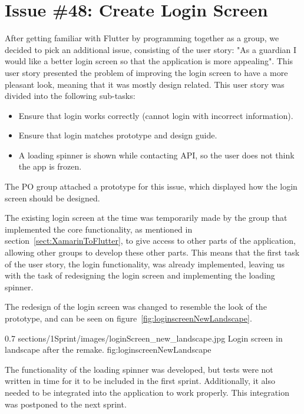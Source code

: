 \section{Issue \#48: Create Login Screen}
\label{sect:loginScreenFlutter}
After getting familiar with Flutter by programming together as a group, we decided to pick an additional issue, consisting of the user story:
"As a guardian I would like a better login screen so that the application is more appealing". This user story presented the problem of improving the login screen to have a more pleasant look, meaning that it was mostly design related. 
This user story was divided into the following sub-tasks:

\begin{itemize}
    \item Ensure that login works correctly (cannot login with incorrect information).
    \item Ensure that login matches prototype and design guide.
    \item A loading spinner is shown while contacting API, so the user does not think the app is frozen.
\end{itemize}

The PO group attached a prototype for this issue, which displayed how the login screen should be designed.

The existing login screen at the time was temporarily made by the group that implemented the core functionality, as mentioned in section~\ref{sect:XamarinToFlutter}, to give access to other parts of the application, allowing other groups to develop these other parts. 
This means that the first task of the user story, the login functionality, was already implemented, leaving us with the task of redesigning the login screen and implementing the loading spinner. 

The redesign of the login screen was changed to resemble the look of the prototype, and can be seen on figure~\ref{fig:loginscreenNewLandscape}.

        {0.7} %
        {sections/1Sprint/images/loginScreen_new_landscape.jpg} %
        {Login screen in landscape after the remake.} %
        {fig:loginscreenNewLandscape} %

The functionality of the loading spinner was developed, but tests were not written in time for it to be included in the first sprint. Additionally, it also needed to be integrated into the application to work properly. This integration was postponed to the next sprint.


